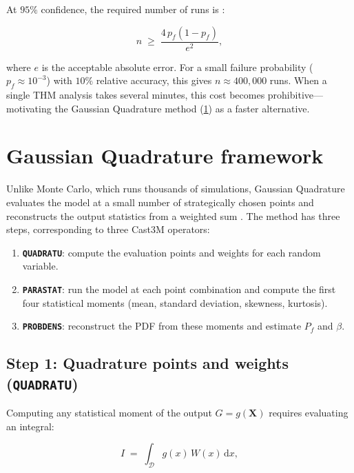 At $95\%$ confidence, the required number of runs is \cite{fenton2014}:

\begin{equation}
    n \;\geq\; \frac{4\,p_f(1-p_f)}{e^2},
    \label{eq:mc-nsample}
\end{equation}

where $e$ is the acceptable absolute error. For a small failure probability ($p_f \approx 10^{-3}$) with $10\%$ relative accuracy, this gives $n \approx 400{,}000$ runs. When a single THM analysis takes several minutes, this cost becomes prohibitive---motivating the Gaussian Quadrature method (\cref{sec:quadrature}) as a faster alternative.


\section{Gaussian Quadrature framework} \label{sec:quadrature}

Unlike Monte Carlo, which runs thousands of simulations, Gaussian Quadrature evaluates the model at a small number of strategically chosen points and reconstructs the output statistics from a weighted sum \cite{sudret2003}. The method has three steps, corresponding to three Cast3M operators:

\begin{enumerate}
    \item \textbf{\texttt{QUADRATU}}: compute the evaluation points and weights for each random variable.
    \item \textbf{\texttt{PARASTAT}}: run the model at each point combination and compute the first four statistical moments (mean, standard deviation, skewness, kurtosis).
    \item \textbf{\texttt{PROBDENS}}: reconstruct the PDF from these moments and estimate $P_f$ and $\beta$.
\end{enumerate}

\subsection{Step 1: Quadrature points and weights (\texttt{QUADRATU})} \label{sec:quad-points}

Computing any statistical moment of the output $G = g(\mathbf{X})$ requires evaluating an integral:

\begin{equation}
    I \;=\; \int_{\mathcal{D}} g(x)\, W(x)\,\mathrm{d}x,
    \label{eq:quad-integral}
\end{equation}

